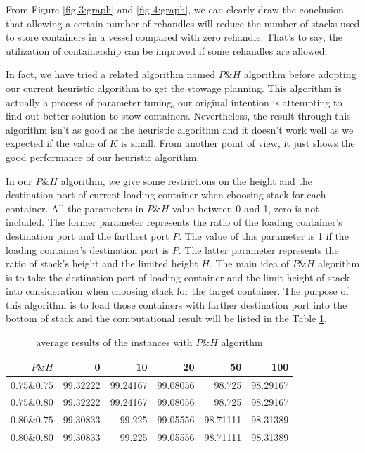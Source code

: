 \documentclass[review,3p,times,authoryear,12pt]{elsarticle}
\begin{document}
From Figure \ref{fig 3:graph} and \ref{fig 4:graph}, we can clearly draw the conclusion that allowing a certain number of rehandles will reduce the number of stacks used to store containers in a vessel compared with zero rehandle.
That's to say, the utilization of containership can be improved if some rehandles are allowed.

In fact, we have tried a related algorithm named $P\&H$ algorithm before adopting our current heuristic algorithm to get the stowage planning.
This algorithm is actually a process of parameter tuning, our original intention is attempting to find out better solution to stow containers.
Nevertheless, the result through this algorithm isn't as good as the heuristic algorithm and it doesn't work well as we expected if the value of $K$ is small.
From another point of view, it just shows the good performance of our heuristic algorithm.

In our $P\&H$ algorithm, we give some restrictions on the height and the destination port of current loading container when choosing stack for each container.
All the parameters in $P\&H$ value between 0 and 1, zero is not included.
The former parameter represents the ratio of the loading container's destination port and the farthest port $P$.
The value of this parameter is 1 if the loading container's destination port is $P$.
The latter parameter represents the ratio of stack's height and the limited height $H$.
The main idea of $P\&H$ algorithm is to take the destination port of loading container and the limit height of stack into consideration when choosing stack for the target container.
The purpose of this algorithm is to load those containers with farther destination port into the bottom of stack and the computational result will be listed in the Table \ref{tab:5}.

\begin{table}[htbp]
  \centering
  \setlength{\belowcaptionskip}{10pt}
  \caption{average results of the instances with $P\&H$ algorithm}
    \begin{tabular}{r|r|r|r|r|r}
    \hline
     $P\&H$       &0   &10  &20  &50  &100\\
    \hline
    $0.75\&0.75$   &99.32222  &99.24167  &99.08056   &98.725  &98.29167\\
    \hline
    $0.75\&0.80$   &99.32222  &99.24167  &99.08056   &98.725  &98.29167\\
    \hline
    $0.80\&0.75$   &99.30833  &99.225  &99.05556   &98.71111  &98.31389\\
    \hline
    $0.80\&0.80$    &99.30833  &99.225  &99.05556   &98.71111  &98.31389\\
    \hline
    \end{tabular}
  \label{tab:5}
\end{table}
\end{document}
